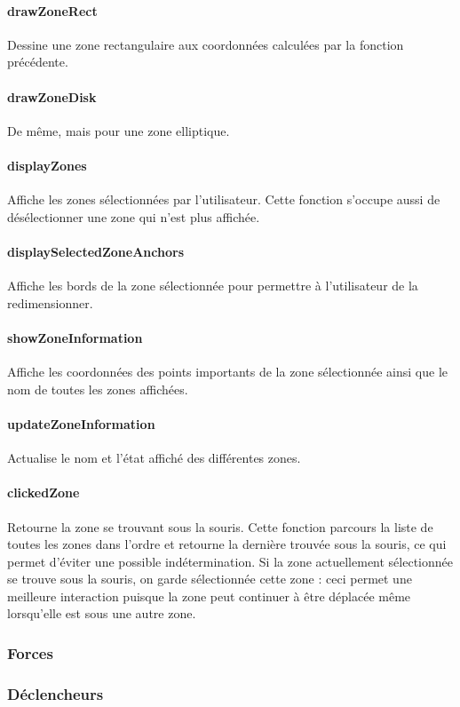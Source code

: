 \documentclass[a4paper]{article}
\begin{document}
\paragraph{drawZoneRect} Dessine une zone rectangulaire aux coordonnées calculées par la fonction précédente.
\paragraph{drawZoneDisk} De même, mais pour une zone elliptique.
\paragraph{displayZones} Affiche les zones sélectionnées par l'utilisateur. Cette fonction s'occupe aussi de désélectionner une zone qui n'est plus affichée.
\paragraph{displaySelectedZoneAnchors} Affiche les bords de la zone sélectionnée pour permettre à l'utilisateur de la redimensionner.
\paragraph{showZoneInformation} Affiche les coordonnées des points importants de la zone sélectionnée ainsi que le nom de toutes les zones affichées.
\paragraph{updateZoneInformation} Actualise le nom et l'état affiché des différentes zones.
\paragraph{clickedZone} Retourne la zone se trouvant sous la souris. Cette fonction parcours la liste de toutes les zones dans l'ordre et retourne la dernière trouvée sous la souris, ce qui permet d'éviter une possible indétermination. Si la zone actuellement sélectionnée se trouve sous la souris, on garde sélectionnée cette zone : ceci permet une meilleure interaction puisque la zone peut continuer à être déplacée même lorsqu'elle est sous une autre zone.
\subsubsection{Forces}
\subsubsection{Déclencheurs}
\end{document}
